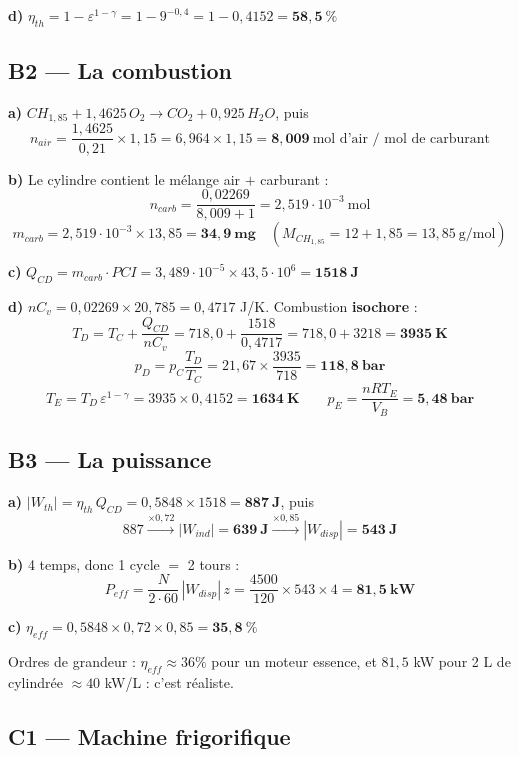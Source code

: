 \documentclass[11pt,a4paper]{article}
\newcommand{\eqb}[1]{\[\boxed{#1}\]}
\begin{document}
\textbf{d)} $\eta_{th}=1-\varepsilon^{1-\gamma}=1-9^{-0,4}=1-0{,}4152=\mathbf{58{,}5\ \%}$

\subsection{B2 --- La combustion}

\textbf{a)} $CH_{1,85}+1{,}4625\,O_2\to CO_2+0{,}925\,H_2O$, puis
\[n_{air}=\frac{1{,}4625}{0{,}21}\times1{,}15=6{,}964\times1{,}15=\mathbf{8{,}009}\
\text{mol d'air / mol de carburant}\]

\textbf{b)} Le cylindre contient le mélange air $+$ carburant :
\[n_{carb}=\frac{0{,}02269}{8{,}009+1}=2{,}519\cdot10^{-3}\ \text{mol}\]
\[m_{carb}=2{,}519\cdot10^{-3}\times13{,}85=\mathbf{34{,}9\ \text{mg}}
\quad (M_{CH_{1,85}}=12+1{,}85=13{,}85\ \text{g/mol})\]

\textbf{c)} $Q_{CD}=m_{carb}\cdot PCI=3{,}489\cdot10^{-5}\times43{,}5\cdot10^{6}
=\mathbf{1518\ \text{J}}$

\textbf{d)} $nC_v=0{,}02269\times20{,}785=0{,}4717$ J/K. Combustion \textbf{isochore} :
\[T_D=T_C+\frac{Q_{CD}}{nC_v}=718{,}0+\frac{1518}{0{,}4717}=718{,}0+3218=\mathbf{3935\ \text{K}}\]
\[p_D=p_C\frac{T_D}{T_C}=21{,}67\times\frac{3935}{718}=\mathbf{118{,}8\ \text{bar}}\]
\[T_E=T_D\,\varepsilon^{1-\gamma}=3935\times0{,}4152=\mathbf{1634\ \text{K}}
\qquad p_E=\frac{nRT_E}{V_B}=\mathbf{5{,}48\ \text{bar}}\]

\subsection{B3 --- La puissance}

\textbf{a)} $|W_{th}|=\eta_{th}\,Q_{CD}=0{,}5848\times1518=\mathbf{887\ \text{J}}$, puis
\[887\xrightarrow{\times0,72}|W_{ind}|=\mathbf{639\ \text{J}}
\xrightarrow{\times0,85}|W_{disp}|=\mathbf{543\ \text{J}}\]

\textbf{b)} 4 temps, donc 1 cycle $=$ 2 tours :
\eqb{P_{eff}=\frac{N}{2\cdot60}\,|W_{disp}|\,z=\frac{4500}{120}\times543\times4
=\mathbf{81{,}5\ \text{kW}}}

\textbf{c)} $\eta_{eff}=0{,}5848\times0{,}72\times0{,}85=\mathbf{35{,}8\ \%}$
\begin{verif}
Ordres de grandeur : $\eta_{eff}\approx36\%$ pour un moteur essence, et $81{,}5$ kW pour 2 L
de cylindrée $\approx40$ kW/L : c'est réaliste. \checkmark
\end{verif}

\subsection{C1 --- Machine frigorifique}
\end{document}
